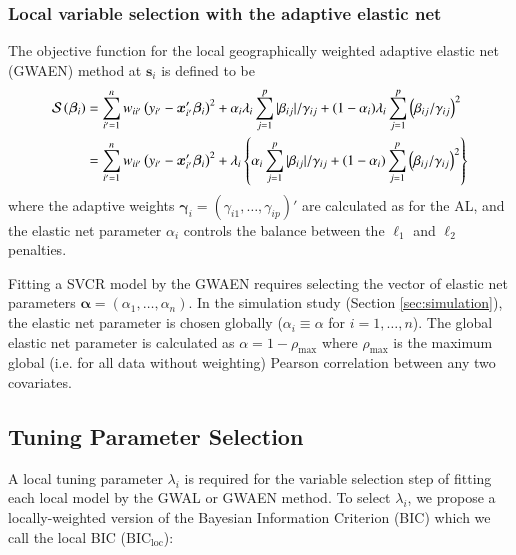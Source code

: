 \documentclass[authoryear, review, 11pt]{elsarticle}
\begin{document}
	\subsubsection{Local variable selection with the adaptive elastic net}
	The objective function for the local geographically weighted adaptive elastic net (GWAEN) method at $\bm{s}_i$ is defined to be
	\begin{align}
		\mathcal{S}\left(\bm{\beta}_i\right) &= \sum_{i'=1}^n w_{ii'} \left(y_{i'} - \bm{x}'_{i'} \bm{\beta}_i \right)^2 + \alpha_i \lambda_i \sum_{j=1}^p |\beta_{ij}| / \gamma_{ij} + (1-\alpha_i) \lambda_i \sum_{j=1}^p  \left( \beta_{ij} / \gamma_{ij} \right)^2\notag\\
		&= \sum_{i'=1}^n w_{ii'} \left(y_{i'} - \bm{x}'_{i'} \bm{\beta}_i \right)^2 + \lambda_i \left\{\alpha_i \sum_{j=1}^p |\beta_{ij}| / \gamma_{ij} + (1-\alpha_i) \sum_{j=1}^p  \left( \beta_{ij} / \gamma_{ij} \right)^2 \right\}
	\end{align}	
	where the adaptive weights $\bm{\gamma}_i = \left(\gamma_{i1}, \dots, \gamma_{ip}\right)'$ are calculated as for the AL, and the elastic net parameter $\alpha_i$ controls the balance between the $\ell_1$ and $\ell_2$ penalties.
	
	Fitting a SVCR model by the GWAEN requires selecting the vector of elastic net parameters $\bm{\alpha} = \left( \alpha_1, \dots, \alpha_n \right)$. In the simulation study (Section \ref{sec:simulation}), the elastic net parameter is chosen globally ($\alpha_i \equiv \alpha$ for $i=1, \dots, n$). The global elastic net parameter is calculated as $\alpha = 1-\rho_{\text{max}}$ where $\rho_{\text{max}}$ is the maximum global (i.e. for all data without weighting) Pearson correlation between any two covariates.

	\subsection{Tuning Parameter Selection}	
	A local tuning parameter $\lambda_i$ is required for the variable selection step of fitting each local model by the GWAL or GWAEN method. To select $\lambda_i$, we propose a locally-weighted version of the Bayesian Information Criterion (BIC) \citep{Schwarz-1978} which we call the local BIC ($\text{BIC}_{\text{loc}}$):
	
\end{document}
